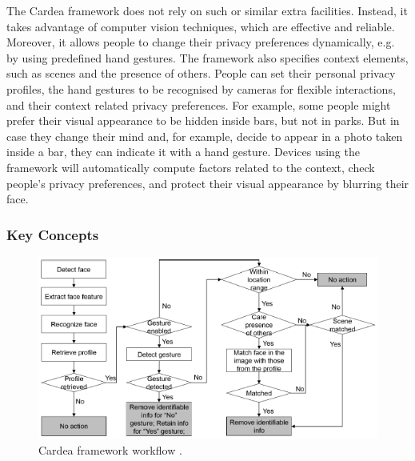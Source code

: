 \documentclass[conference, 11pt]{IEEEtran}
\begin{document}
The Cardea framework \cite{shu2016cardea} does not rely on such or similar extra facilities. Instead, it takes advantage of computer vision techniques, which are effective and reliable. Moreover, it allows people to change their privacy preferences dynamically, e.g. by using predefined hand gestures. The framework also specifies context elements, such as scenes and the presence of others. People can set their personal privacy profiles, the hand gestures to be recognised by cameras for flexible interactions, and their context related privacy preferences. For example, some people might prefer their visual appearance to be hidden inside bars, but not in parks. But in case they change their mind and, for example, decide to appear in a photo taken inside a bar, they can indicate it with a hand gesture. Devices using the framework will automatically compute factors related to the context, check people's privacy preferences, and protect their visual appearance by blurring their face.

\subsubsection{Key Concepts}
\begin{figure}[t]
\centerline{\includegraphics[width=.5\textwidth]{img/cardea_workflow.png}}
\caption{Cardea framework workflow \cite{shu2016cardea}.}
\label{fig:cardea}
\end{figure}
\end{document}
